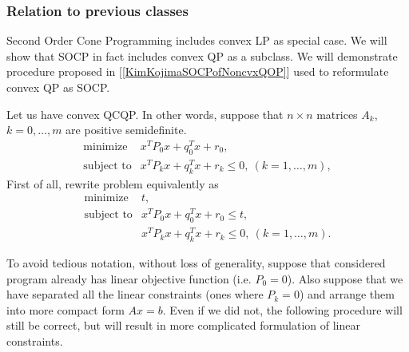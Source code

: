 \documentclass[10pt,oneside]{book}
\theoremstyle{definition}
\begin{document}
\subsubsection{Relation to previous classes}
\label{SectionRelBtwSOCPandQCQP}

Second Order Cone Programming includes convex LP as special case.
We will show that SOCP in fact includes convex QP as a subclass. We will demonstrate procedure proposed in [\ref{KimKojimaSOCPofNoncvxQOP}] used to reformulate convex QP as SOCP.

Let us have convex QCQP. In other words, suppose that $n\times n$ matrices $A_k$, $k=0,\dots ,m$ are positive semidefinite. 
\begin{equation}
\begin{array}{ll}
\mbox{minimize}& x^TP_0x + q_0^Tx + r_0, \\
\mbox{subject to}& x^TP_kx + q_k^Tx + r_k \leq 0, \  (k = 1,\dots ,m),
\end{array} 
\end{equation}
First of all, rewrite problem equivalently as
\begin{equation}
\begin{array}{ll}
\mbox{minimize}& t, \\
\mbox{subject to} & x^TP_0x + q_0^Tx + r_0 \leq t,\\
& x^TP_kx + q_k^Tx + r_k \leq 0, \  (k = 1,\dots ,m).
\end{array} 
\end{equation}

To avoid tedious notation, without loss of generality, suppose that considered program already has linear objective function (i.e. $P_0 = 0$).  Also suppose that we have separated all the linear constraints (ones where $P_k = 0$) and arrange them into more compact form $Ax=b$. Even if we did not, the following procedure will still be correct, but will result in more complicated formulation of linear constraints.
\end{document}
